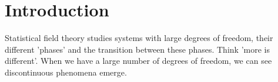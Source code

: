 \section{Introduction}

Statistical field theory studies systems with large degrees of freedom, their different 'phases'  and the transition between these phases. Think 'more is different'. When we have a large number of degrees of freedom, we can see discontinuous phenomena emerge. 


